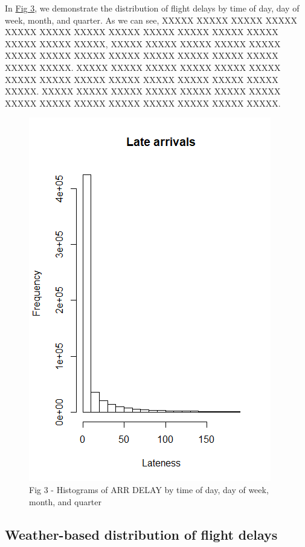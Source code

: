 \documentclass[12pt, a4paper]{book}
\newcommand\tab[1][1cm]{\hspace*{#1}}
\begin{document}
			\tab In \underline{Fig 3}, we demonstrate the distribution of flight delays by time of day, day of week, month, and quarter.  As we can see, XXXXX XXXXX XXXXX XXXXX XXXXX XXXXX XXXXX XXXXX XXXXX XXXXX XXXXX XXXXX XXXXX XXXXX XXXXX, XXXXX XXXXX XXXXX XXXXX XXXXX XXXXX XXXXX XXXXX XXXXX XXXXX XXXXX XXXXX XXXXX XXXXX XXXXX. XXXXX XXXXX XXXXX XXXXX XXXXX XXXXX XXXXX XXXXX XXXXX XXXXX XXXXX XXXXX XXXXX XXXXX XXXXX. XXXXX XXXXX XXXXX XXXXX XXXXX XXXXX XXXXX XXXXX XXXXX XXXXX XXXXX XXXXX XXXXX XXXXX XXXXX.
			\begin{figure}
			\centering
	 		\includegraphics[width = .45 \textwidth]{../figures/LateArrivalsHistogram}
	 		\caption{Fig 3 - Histograms of ARR DELAY by time of day, day of week, month, and quarter}
	 		\end{figure}
	 		
		\subsection{Weather-based distribution of flight delays}
		
\end{document}
